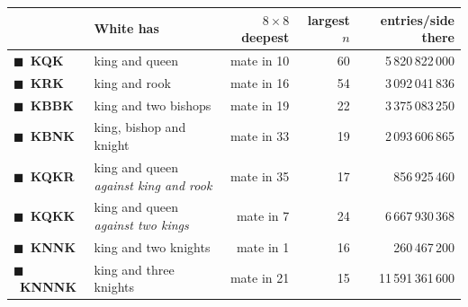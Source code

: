 \documentclass[11pt]{article}
\begin{document}
\begin{center}\small
\begin{tabular}{@{}llrrr@{}}
\toprule
& \textbf{White has} & \textbf{$8\times8$ deepest} & \textbf{largest $n$} & \textbf{entries/side there} \\
\midrule
{\color{kqk}$\blacksquare$}~\textbf{KQK}  & king and queen            & mate in 10 & 60 & 5\,820\,822\,000 \\
{\color{krk}$\blacksquare$}~\textbf{KRK}  & king and rook             & mate in 16 & 54 & 3\,092\,041\,836 \\
{\color{kbbk}$\blacksquare$}~\textbf{KBBK}& king and two bishops      & mate in 19 & 22 & 3\,375\,083\,250 \\
{\color{kbnk}$\blacksquare$}~\textbf{KBNK}& king, bishop and knight   & mate in 33 & 19 & 2\,093\,606\,865 \\
\midrule
{\color{kqkr}$\blacksquare$}~\textbf{KQKR}& king and queen \emph{against king and rook}
                                                                      & mate in 35 & 17 & \phantom{0}856\,925\,460 \\
{\color{kqkk}$\blacksquare$}~\textbf{KQKK}& king and queen \emph{against two kings}
                                                                      & mate in \phantom{0}7 & 24 & 6\,667\,930\,368 \\
\midrule
{\color{knnk}$\blacksquare$}~\textbf{KNNK} & king and two knights     & mate in \phantom{0}1 & 16 & \phantom{00}260\,467\,200 \\
{\color{knnnk}$\blacksquare$}~\textbf{KNNNK}& king and three knights  & mate in 21 & 15 & 11\,591\,361\,600 \\
\bottomrule
\end{tabular}
\end{center}
\end{document}
